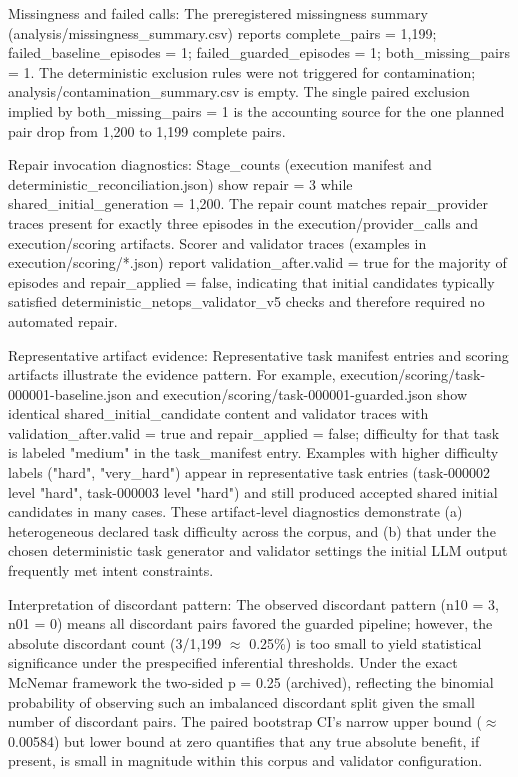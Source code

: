 \documentclass[conference]{IEEEtran}
\begin{document}
Missingness and failed calls: The preregistered missingness summary (analysis/missingness\_summary.csv) reports complete\_pairs = 1,199; failed\_baseline\_episodes = 1; failed\_guarded\_episodes = 1; both\_missing\_pairs = 1. The deterministic exclusion rules were not triggered for contamination; analysis/contamination\_summary.csv is empty. The single paired exclusion implied by both\_missing\_pairs = 1 is the accounting source for the one planned pair drop from 1,200 to 1,199 complete pairs.

Repair invocation diagnostics: Stage\_counts (execution manifest and deterministic\_reconciliation.json) show repair = 3 while shared\_initial\_generation = 1,200. The repair count matches repair\_provider traces present for exactly three episodes in the execution/provider\_calls and execution/scoring artifacts. Scorer and validator traces (examples in execution/scoring/*.json) report validation\_after.valid = true for the majority of episodes and repair\_applied = false, indicating that initial candidates typically satisfied deterministic\_netops\_validator\_v5 checks and therefore required no automated repair.

Representative artifact evidence: Representative task manifest entries and scoring artifacts illustrate the evidence pattern. For example, execution/scoring/task-000001-baseline.json and execution/scoring/task-000001-guarded.json show identical shared\_initial\_candidate content and validator traces with validation\_after.valid = true and repair\_applied = false; difficulty for that task is labeled "medium" in the task\_manifest entry. Examples with higher difficulty labels ("hard", "very\_hard") appear in representative task entries (task-000002 level "hard", task-000003 level "hard") and still produced accepted shared initial candidates in many cases. These artifact‑level diagnostics demonstrate (a) heterogeneous declared task difficulty across the corpus, and (b) that under the chosen deterministic task generator and validator settings the initial LLM output frequently met intent constraints.

Interpretation of discordant pattern: The observed discordant pattern (n10 = 3, n01 = 0) means all discordant pairs favored the guarded pipeline; however, the absolute discordant count (3/1,199 \ensuremath{\approx} 0.25\%) is too small to yield statistical significance under the prespecified inferential thresholds. Under the exact McNemar framework the two‑sided p = 0.25 (archived), reflecting the binomial probability of observing such an imbalanced discordant split given the small number of discordant pairs. The paired bootstrap CI's narrow upper bound (\ensuremath{\approx}0.00584) but lower bound at zero quantifies that any true absolute benefit, if present, is small in magnitude within this corpus and validator configuration.
\end{document}
